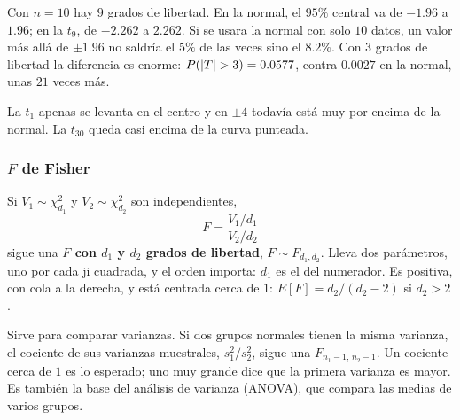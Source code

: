\documentclass[11pt,letterpaper]{article}
\begin{document}
\begin{ejemplo}
    Con $n = 10$ hay $9$ grados de libertad. En la normal, el $95\%$
    central va de $-1.96$ a $1.96$; en la $t_9$, de $-2.262$ a
    $2.262$. Si se usara la normal con solo $10$ datos, un valor más
    allá de $\pm 1.96$ no saldría el $5\%$ de las veces sino el
    $8.2\%$. Con $3$ grados de libertad la diferencia es enorme:
    $P(\left\lvert T \right\rvert > 3) = 0.0577$, contra $0.0027$ en la normal, unas
    $21$ veces más.
    \begin{center}
    \end{center}
    La $t_1$ apenas se levanta en el centro y en $\pm 4$ todavía está
    muy por encima de la normal. La $t_{30}$ queda casi encima de la
    curva punteada.
\end{ejemplo}

\subsubsection*{$F$ de Fisher}

Si $V_1 \sim \chi^2_{d_1}$ y $V_2 \sim \chi^2_{d_2}$ son independientes,
\[
    F = \frac{V_1 / d_1}{V_2 / d_2}
\]
sigue una \textbf{$F$ con $d_1$ y $d_2$ grados de libertad}, $F \sim
F_{d_1, d_2}$. Lleva dos parámetros, uno por cada ji cuadrada, y el
orden importa: $d_1$ es el del numerador. Es positiva, con cola a la
derecha, y está centrada cerca de $1$: $E[F] = d_2 / (d_2 - 2)$ si
$d_2 > 2$.

Sirve para comparar varianzas. Si dos grupos normales tienen la misma
varianza, el cociente de sus varianzas muestrales, $s_1^2 / s_2^2$,
sigue una $F_{n_1 - 1,\, n_2 - 1}$. Un cociente cerca de $1$ es lo
esperado; uno muy grande dice que la primera varianza es mayor. Es
también la base del análisis de varianza (ANOVA), que compara las
medias de varios grupos.
\end{document}
